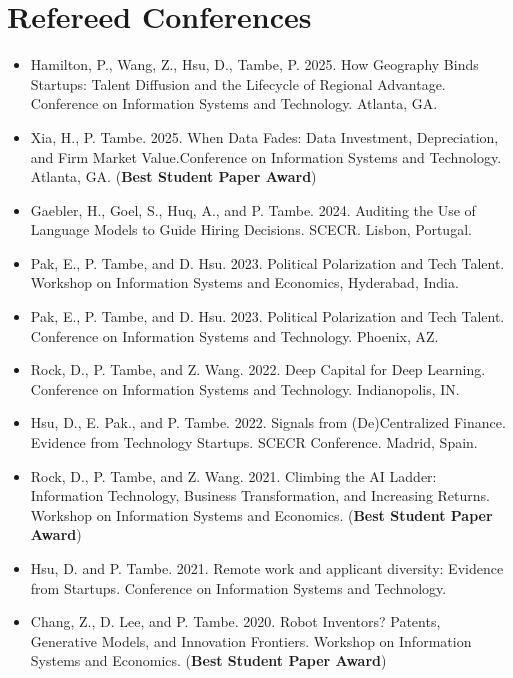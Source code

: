 \documentclass[10pt,letterpaper]{article}
\begin{document}
\section*{Refereed Conferences}
\begin{itemize}
\item Hamilton, P., Wang, Z., Hsu, D., Tambe, P. 2025. How Geography Binds Startups: Talent Diffusion and the Lifecycle of Regional Advantage. Conference on Information Systems and Technology. Atlanta, GA.

\item Xia, H., P. Tambe. 2025. When Data Fades: Data Investment, Depreciation, and Firm Market Value.Conference on Information Systems and Technology. Atlanta, GA. (\textbf{Best Student Paper Award})
  
\item Gaebler, H., Goel, S., Huq, A., and P. Tambe. 2024. Auditing the Use of Language Models to Guide Hiring Decisions. SCECR. Lisbon, Portugal.

\item Pak, E., P. Tambe, and D. Hsu. 2023. Political Polarization and Tech Talent. Workshop on Information Systems and Economics, Hyderabad, India.

\item Pak, E., P. Tambe, and D. Hsu. 2023. Political Polarization and Tech Talent. Conference on Information Systems and Technology. Phoenix, AZ.

\item Rock, D., P. Tambe, and Z. Wang. 2022. Deep Capital for Deep Learning. Conference on Information Systems and Technology. Indianopolis, IN.

\item Hsu, D., E. Pak., and P. Tambe. 2022. Signals from (De)Centralized Finance. Evidence from Technology Startups. SCECR Conference. Madrid, Spain.

\item Rock, D., P. Tambe, and Z. Wang. 2021. Climbing the AI Ladder: Information Technology, Business Transformation, and Increasing Returns. Workshop on Information Systems and Economics. (\textbf{Best Student Paper Award})

\item Hsu, D. and P. Tambe. 2021. Remote work and applicant diversity: Evidence from Startups. Conference on Information Systems and Technology.

\item Chang, Z., D. Lee, and P. Tambe. 2020. Robot Inventors? Patents, Generative Models, and Innovation Frontiers. Workshop on Information Systems and Economics. (\textbf{Best Student Paper Award})


\end{itemize}
\end{document}
